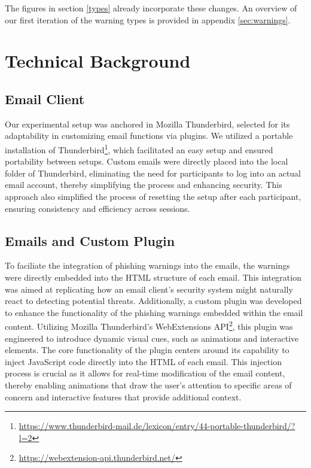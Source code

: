 \documentclass[
  a4paper,  %
  twoside,  %
  bibliography=totoc,
  headsepline,
  cleardoublepage=empty,
  parskip=half,
  draft=false
]{scrbook}
\begin{document}
The figures in section \ref{types} already incorporate these changes. An overview of our first iteration of the warning types is provided in appendix \ref{sec:warnings}.

\section{Technical Background}
\subsection{Email Client}
Our experimental setup was anchored in Mozilla Thunderbird, selected for its adaptability in customizing email functions via plugins. We utilized a portable installation of Thunderbird\footnote{\href{https://www.thunderbird-mail.de/lexicon/entry/44-portable-thunderbird/?l=2}{https://www.thunderbird-mail.de/lexicon/entry/44-portable-thunderbird/?l=2}}, which facilitated an easy setup and ensured portability between setups. Custom emails were directly placed into the local folder of Thunderbird, eliminating the need for participants to log into an actual email account, thereby simplifying the process and enhancing security. This approach also simplified the process of resetting the setup after each participant, ensuring consistency and efficiency across sessions.

\subsection{Emails and Custom Plugin}
To faciliate the integration of phishing warnings into the emails, the warnings were directly embedded into the HTML structure of each email. This integration was aimed at replicating how an email client's security system might naturally react to detecting potential threats.\newline
Additionally, a custom plugin was developed to enhance the functionality of the phishing warnings embedded within the email content. Utilizing Mozilla Thunderbird's WebExtensions API\footnote{ \href{https://webextension-api.thunderbird.net/}{https://webextension-api.thunderbird.net/}}, this plugin was engineered to introduce dynamic visual cues, such as animations and interactive elements.
The core functionality of the plugin centers around its capability to inject JavaScript code directly into the HTML of each email. This injection process is crucial as it allows for real-time modification of the email content, thereby enabling animations that draw the user's attention to specific areas of concern and interactive features that provide additional context.
\end{document}
